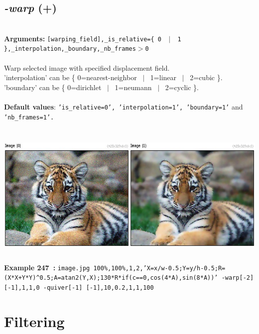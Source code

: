 \documentclass[a4paper,11pt,twoside]{book}
\begin{document}
\subsection{\emph{-warp} (+)}\vspace*{-0.5em}
~\\\textbf{Arguments: } 
{\small \texttt{[warping\_field],\_is\_relative=\{ 0 ~$|$~ 1 \},\_interpolation,\_boundary,\_nb\_frames$>$0}}\\~\\
Warp selected image with specified displacement field.
~\\'interpolation' can be \{ 0=nearest-neighbor ~$|$~ 1=linear ~$|$~ 2=cubic \}.
~\\'boundary' can be \{ 0=dirichlet ~$|$~ 1=neumann ~$|$~ 2=cyclic \}.
~\\~\\\textbf{Default values}: {\small \texttt{'is\_relative=0', 'interpolation=1', 'boundary=1'} and \texttt{'nb\_frames=1'.}}
\begin{center}\includegraphics[keepaspectratio=true,height=7cm,width=\textwidth]{img/gmic_def247.jpg}\\
{\footnotesize \textbf{Example 247~:} \texttt{image.jpg 100\%,100\%,1,2,'X=x/w-0.5;Y=y/h-0.5;R=(X*X+Y*Y)\textasciicircum 0.5;A=atan2(Y,X);130*R*if(c==0,cos(4*A),sin(8*A))' -warp[-2] [-1],1,1,0 -quiver[-1] [-1],10,0.2,1,1,100}}
\end{center}
\section{Filtering}
\end{document}

